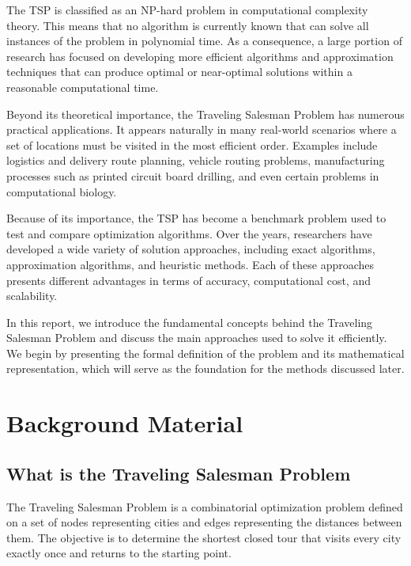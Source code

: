 \documentclass{article}
\begin{document}
The TSP is classified as an NP-hard problem in computational complexity theory. This means
that no algorithm is currently known that can solve all instances of the problem in
polynomial time. As a consequence, a large portion of research has focused on developing
more efficient algorithms and approximation techniques that can produce optimal or
near-optimal solutions within a reasonable computational time.

Beyond its theoretical importance, the Traveling Salesman Problem has numerous practical
applications. It appears naturally in many real-world scenarios where a set of locations must
be visited in the most efficient order. Examples include logistics and delivery route
planning, vehicle routing problems, manufacturing processes such as printed circuit board
drilling, and even certain problems in computational biology.

Because of its importance, the TSP has become a benchmark problem used to test and compare
optimization algorithms. Over the years, researchers have developed a wide variety of
solution approaches, including exact algorithms, approximation algorithms, and heuristic
methods. Each of these approaches presents different advantages in terms of accuracy,
computational cost, and scalability.

In this report, we introduce the fundamental concepts behind the Traveling Salesman Problem
and discuss the main approaches used to solve it efficiently. We begin by presenting the
formal definition of the problem and its mathematical representation, which will serve as the
foundation for the methods discussed later.

\section{Background Material}

\subsection{What is the Traveling Salesman Problem}

The Traveling Salesman Problem is a combinatorial optimization problem defined on a set of
nodes representing cities and edges representing the distances between them. The objective
is to determine the shortest closed tour that visits every city exactly once and returns to
the starting point.
\end{document}
